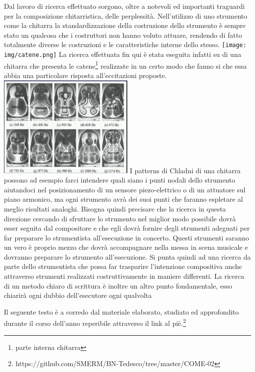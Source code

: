 \documentclass[oneside]{article}
\begin{document}
\begin{multicols*}{2}
Dal lavoro di ricerca effettuato sorgono, oltre a notevoli ed importanti traguardi per la composizione chitarristica, delle perplessità. Nell’utilizzo di uno strumento come la chitarra la standardizzazione della costruzione dello strumento è sempre stato un qualcosa che i costruttori non hanno voluto attuare, rendendo di fatto totalmente diverse le costruzioni e le caratteristiche interne dello stesso.
\texttt{[image: img/catene.png]}
La ricerca effettuata fin qui è stata eseguita infatti su di una chitarra che presenta le catene\footnote{parte interna chitarra} realizzate in un certo modo che fanno si che essa abbia una particolare risposta all’eccitazioni proposte.
\includegraphics[width=0.5\textwidth]{img/chladni1.png}
I patterns di Chladni  di una chitarra possono ad esempio farci intendere quali siano i punti nodali dello strumento aiutandoci nel posizionamento di un sensore piezo-elettrico o di un attuatore sul piano armonico, ma ogni strumento avrà dei suoi punti che faranno espletare al meglio risultati analoghi. Bisogna quindi precisare che la ricerca in questa direzione cercando di sfruttare lo strumento nel miglior modo possibile dovrà esser seguita dal compositore e che egli dovrà fornire degli strumenti adeguati per far preparare lo strumentista all'esecuzione in concerto. Questi strumenti saranno un vero è proprio mezzo che dovrà accompagnare nella messa in scena musicale e dovranno preparare lo strumento all'esecuzione. Si punta quindi ad una ricerca da parte dello strumentista che possa far trasparire l'intenzione compositiva anche attraverso strumenti realizzati costruttivamente in maniere differenti.
La ricerca di un metodo chiaro di scrittura è inoltre un altro punto fondamentale, esso chiarirà ogni dubbio dell'esecutore ogni qualvolta 

Il seguente testo è a corredo dal materiale elaborato, studiato ed approfondito durante il corso dell'anno reperibile attraverso il link al piè.\footnote{https://github.com/SMERM/BN-Tedesco/tree/master/COME-02}

\newpage


\end{multicols*}
\end{document}
